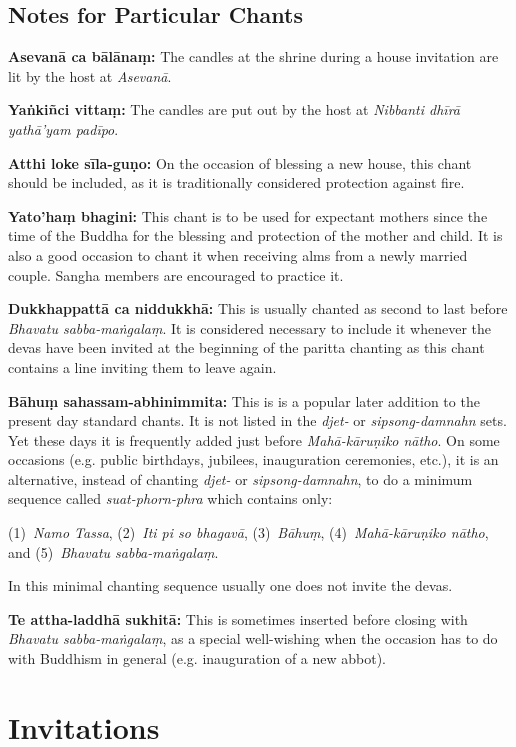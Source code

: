 \subsection{Notes for Particular Chants}

\textbf{Asevanā ca bālānaṃ:} The candles at the shrine during a house invitation
are lit by the host at \emph{Asevanā}.

\textbf{Yaṅkiñci vittaṃ:} The candles are put out by the host at \emph{Nibbanti
  dhīrā yathā'yam padīpo}.

\textbf{Atthi loke sīla-guṇo:} On the occasion of blessing a new house, this
chant should be included, as it is traditionally considered protection against
fire.

\textbf{Yato'haṃ bhagini:} This chant is to be used for expectant mothers since
the time of the Buddha for the blessing and protection of the mother and child.
It is also a good occasion to chant it when receiving alms from a newly married
couple. Sangha members are encouraged to practice it.

\textbf{Dukkhappattā ca niddukkhā:} This is usually chanted as second to last
before \emph{Bhavatu sabba-maṅgalaṃ}. It is considered necessary to include it
whenever the devas have been invited at the beginning of the paritta chanting
as this chant contains a line inviting them to leave again.

\textbf{Bāhuṃ sahassam-abhinimmita:} This is is a popular later addition to the
present day standard chants. It is not listed in the \emph{djet-} or
\emph{sipsong-damnahn} sets. Yet these days it is frequently added just before
\emph{Mahā-kāruṇiko nātho}. On some occasions (e.g. public birthdays, jubilees,
inauguration ceremonies, etc.), it is an alternative, instead of chanting
\emph{djet-} or \emph{sipsong-damnahn}, to do a minimum sequence called
\emph{suat-phorn-phra} which contains only:

(1)~\emph{Namo Tassa},
(2)~\emph{Iti pi so bhagavā},
(3)~\emph{Bāhuṃ}, 
(4)~\emph{Mahā-kāruṇiko nātho}, and
(5)~\emph{Bhavatu sabba-maṅgalaṃ}.

In this minimal chanting sequence usually one does not invite the devas.

\textbf{Te attha-laddhā sukhitā:} This is sometimes inserted before closing with
\emph{Bhavatu sabba-maṅgalaṃ}, as a special well-wishing when the occasion has
to do with Buddhism in general (e.g. inauguration of a new abbot).

\clearpage

\section{Invitations}

